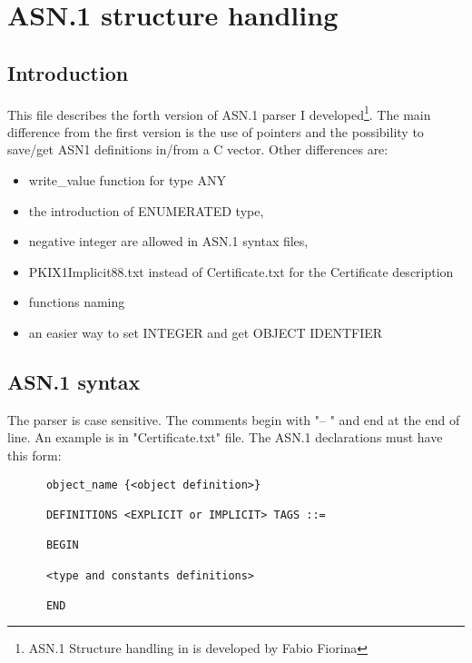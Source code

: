 \chapter{ASN.1 structure handling}

\section{Introduction}
 This file describes the forth version of ASN.1 parser I
developed\footnote{ASN.1 Structure handling in \gnutls{} is developed by Fabio
Fiorina}.
The main difference from the first version is the use of pointers and the
possibility to save/get ASN1 definitions in/from a C vector.
Other differences are:
\begin{itemize}
\item write\_value function for type ANY
\item the introduction of ENUMERATED type,
\item negative integer are allowed in ASN.1 syntax files,
\item PKIX1Implicit88.txt instead of Certificate.txt for the Certificate description
\item functions naming 
\item an easier way to set INTEGER and get OBJECT IDENTFIER  
\end{itemize}


\section{ASN.1 syntax}
The parser is case sensitive. The comments begin with "-- " and end at the end of line.
An example is in "Certificate.txt" file.
The ASN.1 declarations must have this form:
      
\begin{verbatim}
      object_name {<object definition>}

      DEFINITIONS <EXPLICIT or IMPLICIT> TAGS ::=

      BEGIN 

      <type and constants definitions>

      END
\end{verbatim}

